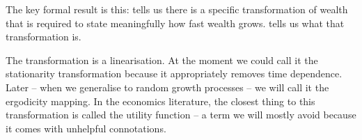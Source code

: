 The key formal result is this:  tells us there is a specific transformation of wealth that is
required to state meaningfully how fast wealth grows.  tells us what that transformation is.

The transformation is a linearisation. At the moment we could call it the stationarity transformation 
because it appropriately removes time dependence. Later -- when we generalise to random growth 
processes -- we will call it the ergodicity mapping. In the economics literature, the closest thing to this
transformation is called the utility function -- a term we will mostly avoid because it comes with unhelpful 
connotations.

%
%
